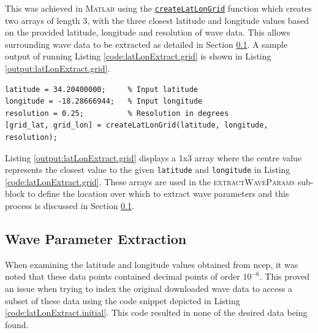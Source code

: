 This was achieved in \textsc{Matlab} using the \href{https://github.com/JNSRYA006/sar-parameter-extraction-pipeline/blob/main/functions/waveSpectra/generateSingleJONSWAP.m}{\lstinline{createLatLonGrid}} function which creates two arrays of length 3, with the three closest latitude and longitude values based on the provided latitude, longitude and resolution of wave data. This allows surrounding wave data to be extracted as detailed in Section \ref{subsec:systemDesign.waveSpectrum.parameters}. A sample output of running Listing \ref{code:latLonExtract.grid} is shown in Listing \ref{output:latLonExtract.grid}.

\begin{lstlisting}[caption={\textsc{Matlab} code used to define grid values of latitude and longitude.},label={code:latLonExtract.grid}]
latitude = 34.20400000;     % Input latitude
longitude = -18.28666944;   % Input longitude
resolution = 0.25;          % Resolution in degrees
[grid_lat, grid_lon] = createLatLonGrid(latitude, longitude, resolution);
\end{lstlisting}



Listing \ref{output:latLonExtract.grid} displays a 1x3 array where the centre value represents the closest value to the given \lstinline{latitude} and \lstinline{longitude} in Listing \ref{code:latLonExtract.grid}. These arrays are used in the \textsc{extractWaveParams} sub-block to define the location over which to extract wave parameters and this process is discussed in Section \ref{subsec:systemDesign.waveSpectrum.parameters}.


\subsection{Wave Parameter Extraction} \label{subsec:systemDesign.waveSpectrum.parameters}

When examining the latitude and longitude values obtained from \acs{ncep}, it was noted that these data points contained decimal points of order $10^{-6}$. This proved an issue when trying to index the original downloaded wave data to access a subset of these data using the code snippet depicted in Listing \ref{code:latLonExtract.initial}. This code resulted in none of the desired data being found.

